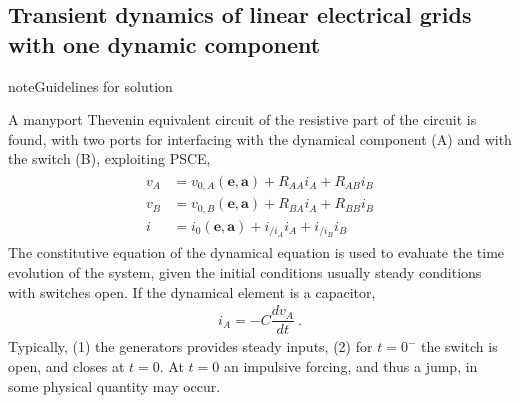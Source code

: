 \documentclass[letterpaper,10pt,italian]{jupyterBook}
\begin{document}
\subsection{Transient dynamics of linear electrical grids with one dynamic component}
\label{\detokenize{ch/electrical-engineering-exercises-transient-1-dynamic:transient-dynamics-of-linear-electrical-grids-with-one-dynamic-component}}\label{\detokenize{ch/electrical-engineering-exercises-transient-1-dynamic:classical-electromagnetism-electrical-engineering-exercises-transient-1-dynamic}}\label{\detokenize{ch/electrical-engineering-exercises-transient-1-dynamic::doc}}
\begin{sphinxadmonition}{note}{Guidelines for solution}

\sphinxAtStartPar
A many\sphinxhyphen{}port Thevenin equivalent circuit of the resistive part of the circuit is found, with two ports for interfacing with the dynamical component (A) and with the switch (B), exploiting PSCE,
\begin{equation*}
\begin{split}\begin{aligned}
  v_A & = v_{0,A}(\mathbf{e},\mathbf{a}) + R_{AA} i_A + R_{AB} i_B \\
  v_B & = v_{0,B}(\mathbf{e},\mathbf{a}) + R_{BA} i_A + R_{BB} i_B \\
  i   & =   i_{0}(\mathbf{e},\mathbf{a}) + i_{/i_A} i_A + i_{/i_B} i_B
\end{aligned}\end{split}
\end{equation*}
\sphinxAtStartPar
The constitutive equation of the dynamical equation is used to evaluate the time evolution of the system, given the initial conditions \sphinxhyphen{} usually steady conditions with switches open. If the dynamical element is a capacitor,
\begin{equation*}
\begin{split}i_A = - C \dfrac{d v_A}{dt} \ .\end{split}
\end{equation*}
\sphinxAtStartPar
Typically, (1) the generators provides steady inputs, (2) for \(t = 0^{-}\) the switch is open, and closes at \(t = 0\). At \(t=0\) an impulsive forcing, and thus a jump, in some physical quantity may occur.


\end{sphinxadmonition}
\end{document}
